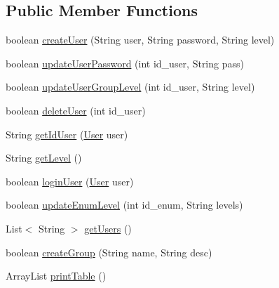 \subsection*{Public Member Functions}
\begin{DoxyCompactItemize}
\item 
boolean \hyperlink{classcom_1_1eneri_1_1scorpio__metertool_1_1database_1_1_user_manager_a756d5c6df3b3bd59097d0a9fe9313bb8}{create\+User} (String user, String password, String level)
\item 
boolean \hyperlink{classcom_1_1eneri_1_1scorpio__metertool_1_1database_1_1_user_manager_a7fc8140ab4667ec1b0e5ef0d6720ae7e}{update\+User\+Password} (int id\+\_\+user, String pass)
\item 
boolean \hyperlink{classcom_1_1eneri_1_1scorpio__metertool_1_1database_1_1_user_manager_a2189b2b16ce71252429f7c6f9ca9b8de}{update\+User\+Group\+Level} (int id\+\_\+user, String level)
\item 
boolean \hyperlink{classcom_1_1eneri_1_1scorpio__metertool_1_1database_1_1_user_manager_a3342d5dcb84b4e602cc9fc3a6d4a257a}{delete\+User} (int id\+\_\+user)
\item 
String \hyperlink{classcom_1_1eneri_1_1scorpio__metertool_1_1database_1_1_user_manager_a6c93b2d2cfe26d01f7255eecc9e4dafa}{get\+Id\+User} (\hyperlink{classcom_1_1eneri_1_1scorpio__metertool_1_1database_1_1_user}{User} user)
\item 
String \hyperlink{classcom_1_1eneri_1_1scorpio__metertool_1_1database_1_1_user_manager_acfe87aca3aaad73cdadad45f422460a6}{get\+Level} ()
\item 
boolean \hyperlink{classcom_1_1eneri_1_1scorpio__metertool_1_1database_1_1_user_manager_ac18cbae06acb19dcb668fbb922a97e51}{login\+User} (\hyperlink{classcom_1_1eneri_1_1scorpio__metertool_1_1database_1_1_user}{User} user)
\item 
boolean \hyperlink{classcom_1_1eneri_1_1scorpio__metertool_1_1database_1_1_user_manager_adbd859a4d61418301fe1882d4a59a57b}{update\+Enum\+Level} (int id\+\_\+enum, String levels)
\item 
List$<$ String $>$ \hyperlink{classcom_1_1eneri_1_1scorpio__metertool_1_1database_1_1_user_manager_a95872804080b8a937373e148a5608017}{get\+Users} ()
\item 
boolean \hyperlink{classcom_1_1eneri_1_1scorpio__metertool_1_1database_1_1_user_manager_a617117a56c10ae1e7928484c5971b16e}{create\+Group} (String name, String desc)
\item 
Array\+List \hyperlink{classcom_1_1eneri_1_1scorpio__metertool_1_1database_1_1_user_manager_ae0d6c84117f2274dce008e52869b2623}{print\+Table} ()

\end{DoxyCompactItemize}
